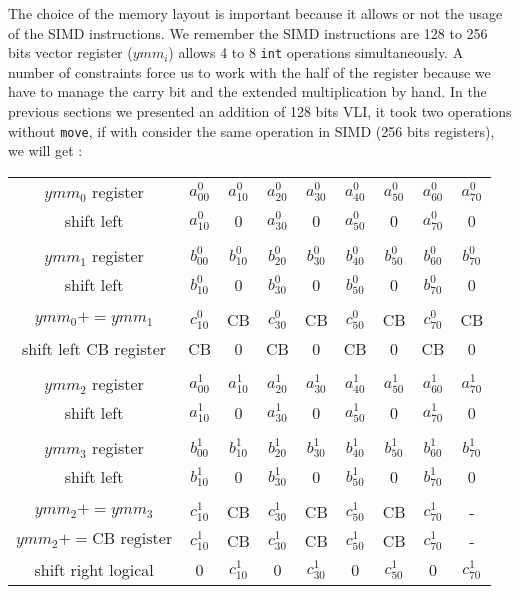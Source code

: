 \documentclass[11pt]{amsart}
\begin{document}
The choice of the memory layout is important because it allows or not the usage of the SIMD instructions. We remember  the SIMD instructions are 128 to 256 bits vector register ($ymm_i$) allows 4 to 8 \texttt{int}  operations simultaneously.
A number of constraints force us to work with the half of the register because we have to manage the carry bit and the extended multiplication by hand. In the previous sections we presented an addition of 128 bits VLI, it took two operations
without \texttt{move}, if with consider the same operation in SIMD (256 bits registers), we will get : 


\begin{center}
\begin{tabular}{ c  c c c c c c c c} 
 $ymm_0$   register      &    $a^0_{00}$  & $a^0_{10}$ & $a^0_{20}$  &  $a^0_{30}$ & $a^0_{40}$  &   $a^0_{50}$ &  $a^0_{60}$   & $a^0_{70}$  \\
  shift left    &    $a^0_{10}$  & 0 & $a^0_{30}$  &  0  & $a^0_{50}$  &   0  &  $a^0_{70}$   & 0  \\
  \\
 $ymm_1$   register      &    $b^0_{00}$  & $b^0_{10}$ & $b^0_{20}$  &  $b^0_{30}$ & $b^0_{40}$  &   $b^0_{50}$ &  $b^0_{60}$   & $b^0_{70}$  \\
  shift left     &    $b^0_{10}$  & 0 & $b^0_{30}$  &  0  & $b^0_{50}$  &   0  &  $b^0_{70}$   & 0  \\
\\
$ymm_0 += ymm_1$           &    $c^0_{10}$  & CB & $c^0_{30}$  &  CB  & $c^0_{50}$  &  CB  &  $c^0_{70}$   & CB  \\
shift left  CB register        & CB & 0 & CB & 0 & CB & 0 & CB & 0 \\
\\
$ymm_2$   register      &    $a^1_{00}$  & $a^1_{10}$ & $a^1_{20}$  &  $a^1_{30}$ & $a^1_{40}$  &   $a^1_{50}$ &  $a^1_{60}$   & $a^1_{70}$  \\
shift left     &    $a^1_{10}$  & 0 & $a^1_{30}$  &  0  & $a^1_{50}$  &   0  &  $a^1_{70}$   & 0  \\
 \\
 $ymm_3$   register      &    $b^1_{00}$  & $b^1_{10}$ & $b^1_{20}$  &  $b^1_{30}$ & $b^1_{40}$  &   $b^1_{50}$ &  $b^1_{60}$   & $b^1_{70}$  \\
  shift left   &    $b^1_{10}$  & 0 & $b^1_{30}$  &  0  & $b^1_{50}$  &   0  &  $b^1_{70}$   & 0  \\
\\
$ymm_2 += ymm_3$                                  &    $c^1_{10}$  & CB & $c^1_{30}$  &  CB  & $c^1_{50}$  &  CB  &  $c^1_{70}$   & -  \\
$ymm_2 +=  \textrm{CB register} $            &    $c^1_{10} $  & CB & $c^1_{30}$  &  CB  & $c^1_{50}$  &  CB  &  $c^1_{70}$   & -  \\
 shift right logical          &  0     &    $c^1_{10} $  & 0 & $c^1_{30}$  &  0 & $c^1_{50}$  & 0  &  $c^1_{70}$    \\

\end{tabular}
\end{center}
\end{document}
